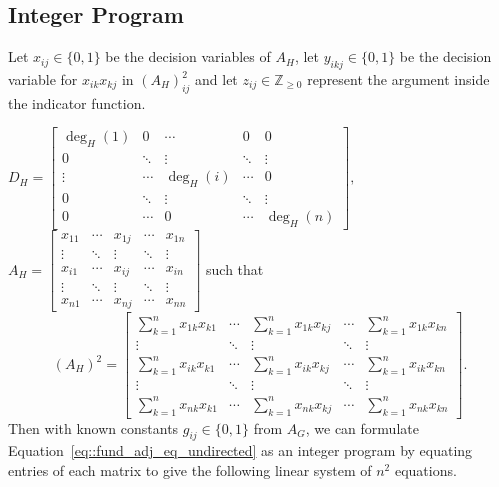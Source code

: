 \documentclass[11pt]{article}
\begin{document}
\subsection{Integer Program} \label{subsec::IP}
Let $x_{ij} \in \{0, 1\}$ be the decision variables of $A_H$, let $y_{ikj} \in \{0, 1\}$ be the decision variable for $x_{ik}x_{kj}$ in $(A_H)^2_{ij}$ and let $z_{ij} \in \mathbb{Z}_{\geq 0}$ represent the argument inside the indicator function. 

$\displaystyle 
D_H =
\begin{bmatrix}
\deg_H(1) & 0      & \cdots & 0 & 0      \\
0         & \ddots & \vdots & \ddots & \vdots \\
\vdots    & \cdots & \deg_H(i) & \cdots & 0      \\
0         & \ddots & \vdots & \ddots & \vdots \\
0         & \cdots & 0      & \cdots & \deg_H(n)
\end{bmatrix}, 
$ 
$\displaystyle A_H =
\begin{bmatrix}
x_{11} & \cdots & x_{1j} & \cdots & x_{1n} \\
\vdots  & \ddots  & \vdots & \ddots & \vdots  \\
x_{i1} & \cdots & x_{ij} & \cdots & x_{in} \\
\vdots  & \ddots  & \vdots & \ddots & \vdots  \\
x_{n1} & \cdots & x_{nj} & \cdots & x_{nn}
\end{bmatrix}
$ such that 
\[
(A_H)^2 = \begin{bmatrix}
\displaystyle \sum_{k=1}^n x_{1k}x_{k1} & \cdots & \displaystyle \sum_{k=1}^n x_{1k}x_{kj} & \cdots & \displaystyle \sum_{k=1}^n x_{1k}x_{kn} \\
\vdots  & \ddots  & \vdots & \ddots & \vdots  \\
\displaystyle \sum_{k=1}^n x_{ik}x_{k1} & \cdots & \displaystyle \sum_{k=1}^n x_{ik}x_{kj} & \cdots & \displaystyle \sum_{k=1}^n x_{ik}x_{kn} \\
\vdots  & \ddots  & \vdots & \ddots & \vdots  \\
\displaystyle \sum_{k=1}^n x_{nk}x_{k1} & \cdots & \displaystyle \sum_{k=1}^n x_{nk}x_{kj} & \cdots & \displaystyle \sum_{k=1}^n x_{nk}x_{kn}
\end{bmatrix}.
\]
Then with known constants $g_{ij} \in \{0, 1\}$ from $A_G$, we can formulate Equation~\eqref{eq::fund_adj_eq_undirected} as an integer program by equating entries of each matrix to give the following linear system of $n^2$ equations.
\end{document}
